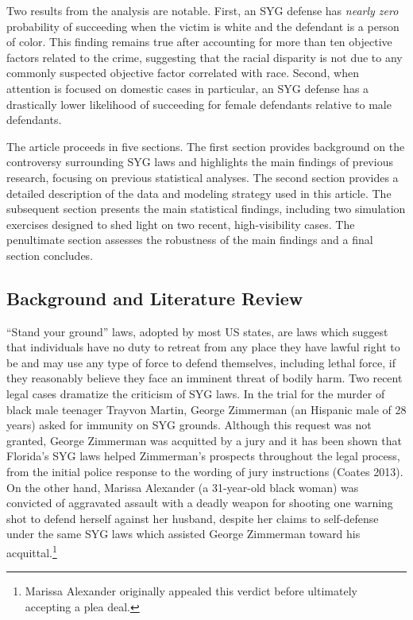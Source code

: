 \documentclass[12pt,article]{article}
\begin{document}
Two results from the analysis are notable. First, an SYG defense has
\emph{nearly zero} probability of succeeding when the victim is white
and the defendant is a person of color. This finding remains true after
accounting for more than ten objective factors related to the crime,
suggesting that the racial disparity is not due to any commonly
suspected objective factor correlated with race. Second, when attention
is focused on domestic cases in particular, an SYG defense has a
drastically lower likelihood of succeeding for female defendants
relative to male defendants.

The article proceeds in five sections. The first section provides
background on the controversy surrounding SYG laws and highlights the
main findings of previous research, focusing on previous statistical
analyses. The second section provides a detailed description of the data
and modeling strategy used in this article. The subsequent section
presents the main statistical findings, including two simulation
exercises designed to shed light on two recent, high-visibility cases.
The penultimate section assesses the robustness of the main findings and
a final section concludes.

\subsection{Background and Literature
Review}\label{background-and-literature-review}

``Stand your ground'' laws, adopted by most US states, are laws which
suggest that individuals have no duty to retreat from any place they
have lawful right to be and may use any type of force to defend
themselves, including lethal force, if they reasonably believe they face
an imminent threat of bodily harm. Two recent legal cases dramatize the
criticism of SYG laws. In the trial for the murder of black male
teenager Trayvon Martin, George Zimmerman (an Hispanic male of 28 years)
asked for immunity on SYG grounds. Although this request was not
granted, George Zimmerman was acquitted by a jury and it has been shown
that Florida's SYG laws helped Zimmerman's prospects throughout the
legal process, from the initial police response to the wording of jury
instructions (Coates 2013). On the other hand, Marissa Alexander (a
31-year-old black woman) was convicted of aggravated assault with a
deadly weapon for shooting one warning shot to defend herself against
her husband, despite her claims to self-defense under the same SYG laws
which assisted George Zimmerman toward his acquittal.\footnote{Marissa
  Alexander originally appealed this verdict before ultimately accepting
  a plea deal.}
\end{document}
